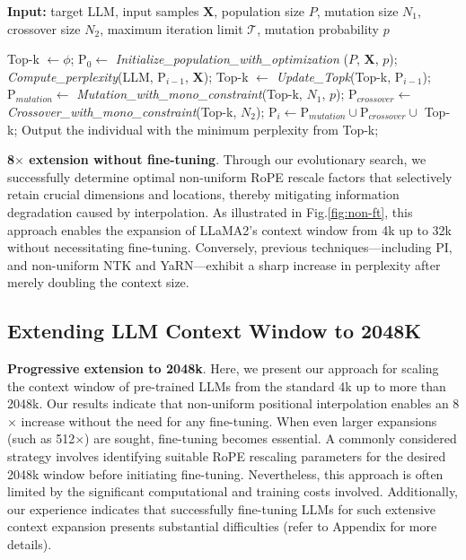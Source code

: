 \begin{algorithm}[t]
	\small
	\caption{The search algorithm}
	\textbf{Input:} target LLM, input samples $\mathbf{X}$, population size $P$, mutation size $N_1$, crossover size $N_2$, maximum iteration limit $\mathcal{T}$, mutation probability $p$\\

	\begin{algorithmic}[1]
		\label{alg:search}
		\STATE Top-k $\leftarrow \phi$;	
		\STATE $\text{P}_0 \leftarrow$ \textit{Initialize\_population\_with\_optimization} ($P$, $\mathbf{X}$, $p$);
		\STATE \textit{Compute\_perplexity}(LLM, $\text{P}_{i-1}$, $\mathbf{X}$);
		\STATE Top-k $\leftarrow$ \textit{Update\_Topk}(Top-k, $\text{P}_{i-1}$);
		\STATE $\text{P}_{mutation} \leftarrow$ \textit{Mutation\_with\_mono\_constraint}(Top-k, $N_1$, $p$);
		\STATE $\text{P}_{crossover} \leftarrow$ \textit{Crossover\_with\_mono\_constraint}(Top-k, $N_2$);
		\STATE $\text{P}_i \leftarrow \text{P}_{mutation} \cup \text{P}_{crossover} \cup$ Top-k;
		\ENDFOR
		\STATE Output the individual with the minimum perplexity from Top-k;
	\end{algorithmic}
\end{algorithm}

\textbf{8$\times$ extension without fine-tuning}. Through our evolutionary search, we successfully determine optimal non-uniform RoPE rescale factors that selectively retain crucial dimensions and locations, thereby mitigating information degradation caused by interpolation. As illustrated in Fig.\ref{fig:non-ft}, this approach enables the expansion of LLaMA2’s context window from 4k up to 32k without necessitating fine-tuning. Conversely, previous techniques—including PI, and non-uniform NTK and YaRN—exhibit a sharp increase in perplexity after merely doubling the context size.

\subsection{Extending LLM Context Window to 2048K}
\label{sec:extendto2048k}

\textbf{Progressive extension to 2048k}. Here, we present our approach for scaling the context window of pre-trained LLMs from the standard 4k up to more than 2048k. Our results indicate that non-uniform positional interpolation enables an 8$\times$ increase without the need for any fine-tuning. When even larger expansions (such as 512$\times$) are sought, fine-tuning becomes essential. A commonly considered strategy involves identifying suitable RoPE rescaling parameters for the desired 2048k window before initiating fine-tuning. Nevertheless, this approach is often limited by the significant computational and training costs involved. Additionally, our experience indicates that successfully fine-tuning LLMs for such extensive context expansion presents substantial difficulties (refer to Appendix for more details).


